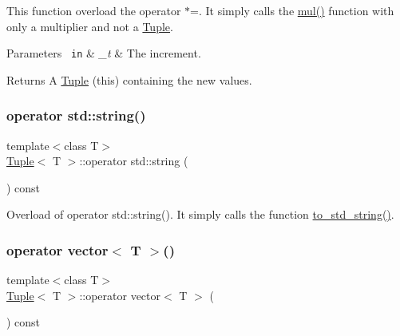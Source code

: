 This function overload the operator $\ast$=. It simply calls the {\ttfamily \mbox{\hyperlink{class_tuple_aa04cadf68dd3658943db047b6fd500fa}{mul()}}} function with only a multiplier and not a {\ttfamily \mbox{\hyperlink{class_tuple}{Tuple}}}. 
\begin{DoxyParams}[1]{Parameters}
\mbox{\texttt{ in}}  & {\em \+\_\+t} & The increment. \\
\hline
\end{DoxyParams}
\begin{DoxyReturn}{Returns}
A {\ttfamily \mbox{\hyperlink{class_tuple}{Tuple}}} (this) containing the new values. 
\end{DoxyReturn}
\mbox{\label{class_tuple_a9a4516890830c7a8bf96c9325718c8c3}} 
\subsubsection{\texorpdfstring{operator std::string()}{operator std::string()}}
{\footnotesize\ttfamily template$<$class T$>$ \\
\mbox{\hyperlink{class_tuple}{Tuple}}$<$ T $>$\+::operator std\+::string (\begin{DoxyParamCaption}{ }\end{DoxyParamCaption}) const\hspace{0.3cm}{\ttfamily [inline]}}



Overload of operator std\+::string(). It simply calls the function {\ttfamily \mbox{\hyperlink{class_tuple_a2c8e5f6fb1abb2b11ab222b7ce772569}{to\+\_\+std\+\_\+string()}}}. 

\mbox{\label{class_tuple_a4189d6fe009e00fbc81061bcad9ee856}} 
\subsubsection{\texorpdfstring{operator vector$<$ T $>$()}{operator vector< T >()}}
{\footnotesize\ttfamily template$<$class T$>$ \\
\mbox{\hyperlink{class_tuple}{Tuple}}$<$ T $>$\+::operator vector$<$ T $>$ (\begin{DoxyParamCaption}{ }\end{DoxyParamCaption}) const\hspace{0.3cm}{\ttfamily [inline]}}



